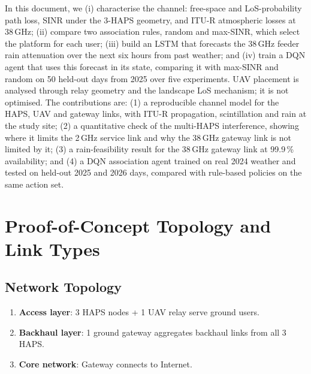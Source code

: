 \documentclass[conference]{IEEEtran}
\begin{document}
In this document, we (i) characterise the channel: free-space and LoS-probability path loss, SINR under the 3-HAPS geometry, and ITU-R atmospheric losses at 38\,GHz; (ii) compare two association rules, random and max-SINR, which select the platform for each user; (iii) build an LSTM that forecasts the 38\,GHz feeder rain attenuation over the next six hours from past weather; and (iv) train a DQN agent that uses this forecast in its state, comparing it with max-SINR and random on 50 held-out days from 2025 over five experiments. UAV placement is analysed through relay geometry and the landscape LoS mechanism; it is not optimised. The contributions are: (1) a reproducible channel model for the HAPS, UAV and gateway links, with ITU-R propagation, scintillation and rain at the study site; (2) a quantitative check of the multi-HAPS interference, showing where it limits the 2\,GHz service link and why the 38\,GHz gateway link is not limited by it; (3) a rain-feasibility result for the 38\,GHz gateway link at 99.9\,\% availability; and (4) a DQN association agent trained on real 2024 weather and tested on held-out 2025 and 2026 days, compared with rule-based policies on the same action set.

\section{Proof-of-Concept Topology and Link Types}

\subsection{Network Topology}

\begin{enumerate}
  \item \textbf{Access layer}: 3 HAPS nodes + 1 UAV relay serve ground users.
  \item \textbf{Backhaul layer}: 1 ground gateway aggregates backhaul links from all 3 HAPS.
  \item \textbf{Core network}: Gateway connects to Internet.
\end{enumerate}
\end{document}
